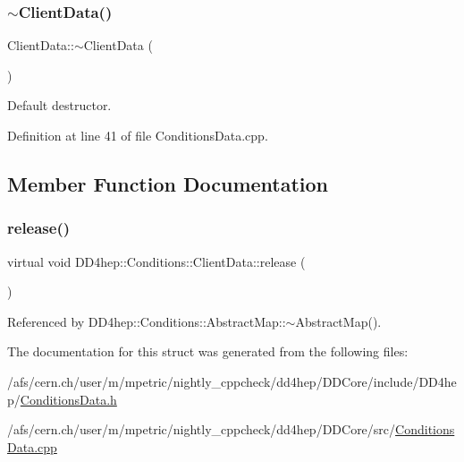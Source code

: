 \subsubsection{\texorpdfstring{$\sim$\+Client\+Data()}{~ClientData()}}
{\footnotesize\ttfamily Client\+Data\+::$\sim$\+Client\+Data (\begin{DoxyParamCaption}{ }\end{DoxyParamCaption})\hspace{0.3cm}{\ttfamily [virtual]}}



Default destructor. 



Definition at line 41 of file Conditions\+Data.\+cpp.



\subsection{Member Function Documentation}
\hypertarget{struct_d_d4hep_1_1_conditions_1_1_client_data_a70db3debbb53fc7249ca198a2cd32e9b}{}\label{struct_d_d4hep_1_1_conditions_1_1_client_data_a70db3debbb53fc7249ca198a2cd32e9b} 
\subsubsection{\texorpdfstring{release()}{release()}}
{\footnotesize\ttfamily virtual void D\+D4hep\+::\+Conditions\+::\+Client\+Data\+::release (\begin{DoxyParamCaption}{ }\end{DoxyParamCaption})\hspace{0.3cm}{\ttfamily [pure virtual]}}



Referenced by D\+D4hep\+::\+Conditions\+::\+Abstract\+Map\+::$\sim$\+Abstract\+Map().



The documentation for this struct was generated from the following files\+:\begin{DoxyCompactItemize}
\item 
/afs/cern.\+ch/user/m/mpetric/nightly\+\_\+cppcheck/dd4hep/\+D\+D\+Core/include/\+D\+D4hep/\hyperlink{_conditions_data_8h}{Conditions\+Data.\+h}\item 
/afs/cern.\+ch/user/m/mpetric/nightly\+\_\+cppcheck/dd4hep/\+D\+D\+Core/src/\hyperlink{_conditions_data_8cpp}{Conditions\+Data.\+cpp}\end{DoxyCompactItemize}
